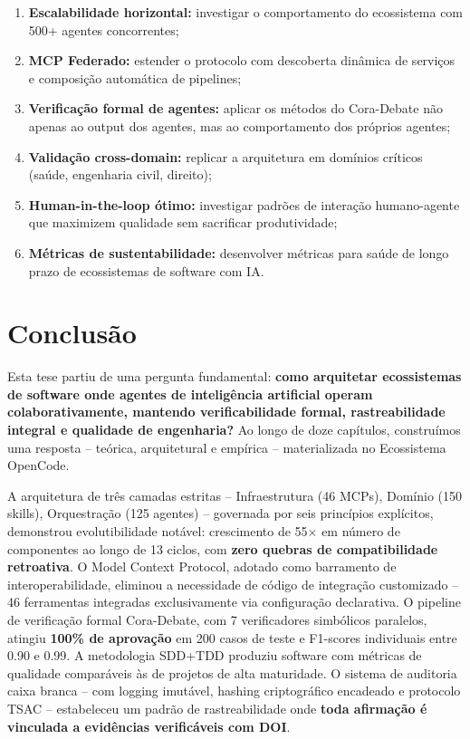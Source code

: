 \documentclass[12pt,a4paper,sumario=tradicional,openany]{abntex2}
\begin{document}
\begin{enumerate}[leftmargin=*]
    \item \textbf{Escalabilidade horizontal:} investigar o comportamento do ecossistema com 500+ agentes concorrentes;
    \item \textbf{MCP Federado:} estender o protocolo com descoberta dinâmica de serviços e composição automática de pipelines;
    \item \textbf{Verificação formal de agentes:} aplicar os métodos do Cora-Debate não apenas ao output dos agentes, mas ao comportamento dos próprios agentes;
    \item \textbf{Validação cross-domain:} replicar a arquitetura em domínios críticos (saúde, engenharia civil, direito);
    \item \textbf{Human-in-the-loop ótimo:} investigar padrões de interação humano-agente que maximizem qualidade sem sacrificar produtividade;
    \item \textbf{Métricas de sustentabilidade:} desenvolver métricas para saúde de longo prazo de ecossistemas de software com IA.
\end{enumerate}

\chapter{Conclusão}

Esta tese partiu de uma pergunta fundamental: \textbf{como arquitetar ecossistemas de software onde agentes de inteligência artificial operam colaborativamente, mantendo verificabilidade formal, rastreabilidade integral e qualidade de engenharia?} Ao longo de doze capítulos, construímos uma resposta -- teórica, arquitetural e empírica -- materializada no Ecossistema OpenCode.

A arquitetura de três camadas estritas -- Infraestrutura (46 MCPs), Domínio (150 skills), Orquestração (125 agentes) -- governada por seis princípios explícitos, demonstrou evolutibilidade notável: crescimento de 55$\times$ em número de componentes ao longo de 13 ciclos, com \textbf{zero quebras de compatibilidade retroativa}. O Model Context Protocol, adotado como barramento de interoperabilidade, eliminou a necessidade de código de integração customizado -- 46 ferramentas integradas exclusivamente via configuração declarativa. O pipeline de verificação formal Cora-Debate, com 7 verificadores simbólicos paralelos, atingiu \textbf{100\% de aprovação} em 200 casos de teste e F1-scores individuais entre 0.90 e 0.99. A metodologia SDD+TDD produziu software com métricas de qualidade comparáveis às de projetos de alta maturidade. O sistema de auditoria caixa branca -- com logging imutável, hashing criptográfico encadeado e protocolo TSAC -- estabeleceu um padrão de rastreabilidade onde \textbf{toda afirmação é vinculada a evidências verificáveis com DOI}.
\end{document}
